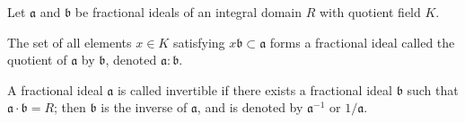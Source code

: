Let $\mathfrak{a}$ and $\mathfrak{b}$ be fractional ideals of an integral domain $R$ with quotient field $K$.

The set of all elements $x \in K$ satisfying $x\mathfrak{b} \subset \mathfrak{a}$ forms a fractional ideal called the quotient of $\mathfrak{a}$ by $\mathfrak{b}$, denoted $\mathfrak{a} : \mathfrak{b}$.

A fractional ideal $\mathfrak{a}$ is called invertible if there exists a fractional ideal $\mathfrak{b}$ such that $\mathfrak{a} \cdot \mathfrak{b} = R$; then $\mathfrak{b}$ is the inverse of $\mathfrak{a}$, and is denoted by $\mathfrak{a}^{-1}$ or $1/\mathfrak{a}$.
